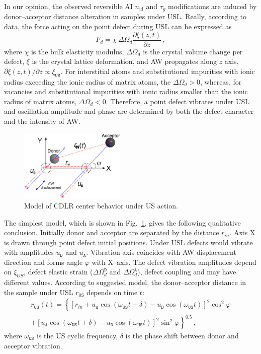 \documentclass[aip,jap, amsmath,amssymb,reprint]{revtex4-1}
\begin{document}
In our opinion, the observed reversible AI $n_{\mathrm{id}}$ and $\tau_g$ modifications are induced by
donor--acceptor distance alteration in samples under USL.
Really, according to data,\cite{MirzadeJAP2011,PeleshchakUJF2016} the force acting on the point defect during USL can be expressed as
\begin{equation}
\label{eqFd}
F_d=\chi\,\Delta\Omega_d\frac{\partial \xi(z,t)}{\partial z}\,,
\end{equation}
where
$\chi$ is the bulk elasticity modulus,
$\Delta\Omega_d$ is the crystal volume change per defect,
$\xi$ is the crystal lattice deformation,
and AW propagates along $z$ axis,
$\partial \xi(z,t)/\partial z\propto \xi_{\mathtt{US}}$.
For interstitial atoms and substitutional impurities with ionic radius exceeding the ionic radius of matrix
atoms, the $\Delta\Omega_d > 0$, whereas,
for vacancies and substitutional impurities with ionic radius smaller than the ionic radius of matrix atoms,
$\Delta\Omega_d < 0$.
Therefore, a point defect vibrates under USL and oscillation amplitude and phase are determined by both the defect character and the intensity of AW.

\begin{figure}
\includegraphics[width=0.45\textwidth]{fig_5}%
\caption{\label{fig_Model}
Model of CDLR center behavior under US action.
}%
\end{figure}

The simplest model, which is shown in Fig.~\ref{fig_Model}, gives the following  qualitative conclusion.
Initially donor and acceptor are separated by the distance $r_{in}$.
Axis X is drawn through point defect initial positions.
Under USL defects would vibrate with amplitudes $u_\mathtt{D}$ and $u_\mathtt{A}$.
Vibration axis coincides with AW displacement direction and forms angle $\varphi$ with  X--axis.
The defect vibration amplitudes depend on $\xi_{U\!S}$, defect elastic strain ($\Delta\Omega_d^\mathtt{D}$ and $\Delta\Omega_d^\mathtt{A}$), defect coupling  and may have different values.
According to suggested model, the donor--acceptor distance in the sample under USL $r_\mathtt{US}$ depends on time $t$:
\begin{multline}
\label{eqrUS}
r_\mathtt{US}(t)=\left\{[r_{in}+u_\mathtt{A}\cos(\omega_\mathtt{US}t+\delta)-u_\mathtt{D}\cos(\omega_\mathtt{US}t)]^2\cos^2\varphi \right.\\
    \left.+ [u_\mathtt{A}\cos(\omega_\mathtt{US}t+\delta)-u_\mathtt{D}\cos(\omega_\mathtt{US}t)]^2\sin^2\varphi\right\}^{0.5}\,,
\end{multline}
where $\omega_\mathtt{US}$ is the US cyclic frequency,
$\delta$ is the phase shift between donor and acceptor vibration.
\end{document}
